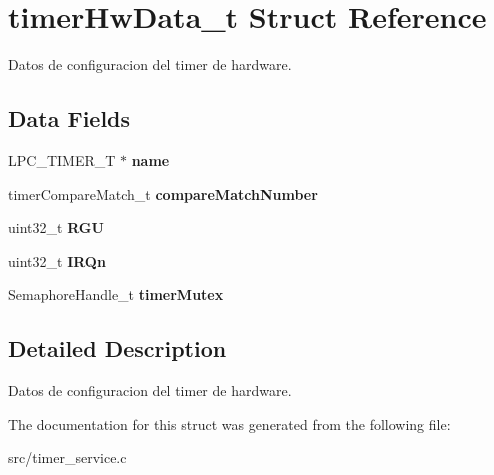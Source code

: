 \hypertarget{structtimerHwData__t}{}\section{timer\+Hw\+Data\+\_\+t Struct Reference}
\label{structtimerHwData__t}


Datos de configuracion del timer de hardware.  


\subsection*{Data Fields}
\begin{DoxyCompactItemize}
\item 
L\+P\+C\+\_\+\+T\+I\+M\+E\+R\+\_\+T $\ast$ {\bfseries name}\hypertarget{structtimerHwData__t_aa178828ec99ff5362e1a63fd91f223c2}{}\label{structtimerHwData__t_aa178828ec99ff5362e1a63fd91f223c2}

\item 
timer\+Compare\+Match\+\_\+t {\bfseries compare\+Match\+Number}\hypertarget{structtimerHwData__t_a933334829e8f0eaf5e66233c6ec18980}{}\label{structtimerHwData__t_a933334829e8f0eaf5e66233c6ec18980}

\item 
uint32\+\_\+t {\bfseries R\+GU}\hypertarget{structtimerHwData__t_aaac08f286ef91768512f7f34b2f31703}{}\label{structtimerHwData__t_aaac08f286ef91768512f7f34b2f31703}

\item 
uint32\+\_\+t {\bfseries I\+R\+Qn}\hypertarget{structtimerHwData__t_a04b8d093b1c5220ac24b0221c977918f}{}\label{structtimerHwData__t_a04b8d093b1c5220ac24b0221c977918f}

\item 
Semaphore\+Handle\+\_\+t {\bfseries timer\+Mutex}\hypertarget{structtimerHwData__t_a6a66bca77ae318f053b6387f5cf76ead}{}\label{structtimerHwData__t_a6a66bca77ae318f053b6387f5cf76ead}

\end{DoxyCompactItemize}


\subsection{Detailed Description}
Datos de configuracion del timer de hardware. 

The documentation for this struct was generated from the following file\+:\begin{DoxyCompactItemize}
\item 
src/timer\+\_\+service.\+c\end{DoxyCompactItemize}
